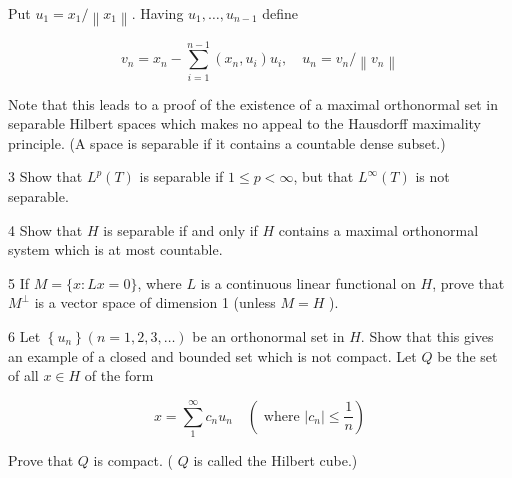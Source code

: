 \documentclass[10pt]{article}
\begin{document}
Put $u_{1}=x_{1} /\left\|x_{1}\right\|$. Having $u_{1}, \ldots, u_{n-1}$ define

$$
v_{n}=x_{n}-\sum_{i=1}^{n-1}\left(x_{n}, u_{i}\right) u_{i}, \quad u_{n}=v_{n} /\left\|v_{n}\right\|
$$

Note that this leads to a proof of the existence of a maximal orthonormal set in separable Hilbert spaces which makes no appeal to the Hausdorff maximality principle. (A space is separable if it contains a countable dense subset.)

3 Show that $L^{p}(T)$ is separable if $1 \leq p<\infty$, but that $L^{\infty}(T)$ is not separable.

4 Show that $H$ is separable if and only if $H$ contains a maximal orthonormal system which is at most countable.

5 If $M=\{x: L x=0\}$, where $L$ is a continuous linear functional on $H$, prove that $M^{\perp}$ is a vector space of dimension 1 (unless $M=H$ ).

6 Let $\left\{u_{n}\right\}(n=1,2,3, \ldots)$ be an orthonormal set in $H$. Show that this gives an example of a closed and bounded set which is not compact. Let $Q$ be the set of all $x \in H$ of the form

$$
x=\sum_{1}^{\infty} c_{n} u_{n} \quad\left(\text { where }\left|c_{n}\right| \leq \frac{1}{n}\right)
$$

Prove that $Q$ is compact. ( $Q$ is called the Hilbert cube.)
\end{document}
